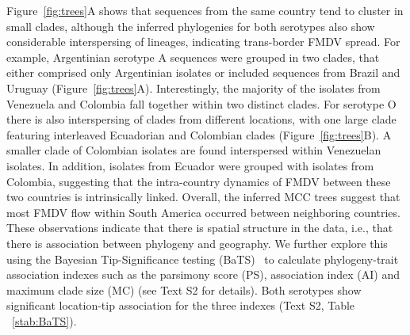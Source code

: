 \documentclass[10pt]{article}
\begin{document}
Figure~\ref{fig:trees}A shows that sequences from the same country tend to cluster in small clades, although the inferred phylogenies for both serotypes also show considerable interspersing of lineages, indicating trans-border FMDV spread.
For example, Argentinian serotype A sequences were grouped in two clades, that either comprised only Argentinian isolates or included sequences from Brazil and Uruguay (Figure~\ref{fig:trees}A).
Interestingly, the majority of the isolates from Venezuela and Colombia fall together within two distinct clades. %
For serotype O there is also interspersing of clades from different locations, with  one large clade featuring interleaved Ecuadorian and Colombian clades (Figure~\ref{fig:trees}B). %
A smaller clade of Colombian isolates are found interspersed within Venezuelan isolates.
In addition, isolates from Ecuador were grouped with isolates from Colombia, suggesting that the intra-country dynamics of FMDV between these two countries is intrinsically linked.
Overall, the inferred MCC trees suggest that most FMDV flow within South America occurred between neighboring countries. 
These observations indicate that there is spatial structure in the data, i.e., that there is association between phylogeny and geography.
We further explore this using the Bayesian Tip-Significance testing (BaTS)~\cite{bats} to calculate phylogeny-trait association indexes such as the parsimony score (PS), association index (AI) and maximum clade size (MC) (see Text S2 for details).
Both serotypes show significant location-tip association for the three indexes (Text S2, Table ~\ref{stab:BaTS}).
\end{document}
